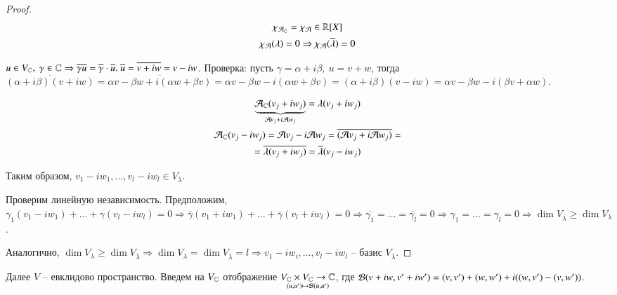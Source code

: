 \documentclass[main]{subfiles}
\begin{document}
\begin{proof}
    \begin{gather*}
        \chi_{\mathcal{A}_{\mathbb{C}}} = \chi_{\mathcal{A}} \in \mathbb{R}[X] \\
        \chi_{\mathcal{A}}(\lambda) = 0 \Rightarrow \chi_{\mathcal{A}}(\overline{\lambda}) = 0 \\
    \end{gather*}
    
    \begin{remark}
        $u \in V_{\C}, \ \gamma \in \C \Rightarrow \overline{\gamma u} = \overline{\gamma} \cdot \overline{u}. \ \overline{u} = \overline{v + iw} = v - iw$.
        Проверка: пусть $\gamma = \alpha + i\beta, \ u = v + w$, тогда $\overline{(\alpha + i\beta)(v + iw)} =
         \overline{\alpha v - \beta w + i(\alpha w + \beta v)} = \alpha v - \beta w - i(\alpha w + \beta v) = (\alpha + i\beta)(v - iw) =
        \alpha v - \beta w -i(\beta v + \alpha w)$.
    \end{remark}

    \begin{gather*}
        \underbrace{\mathcal{A}_{\mathbb{C}}(v_j + iw_j)}_{\mathcal{A} v_j + i\mathcal{A} w_j} = \lambda(v_j + iw_j) \\
        \mathcal{A}_{\mathbb{C}}(v_j - iw_j) = \mathcal{A} v_j - i\mathcal{A} w_j = \overline{(\mathcal{A} v_j + i\mathcal{A} w_j)} = \\
        = \overline{\lambda(v_j + iw_j)} = \overline{\lambda}(v_j-iw_j)
    \end{gather*}

    Таким образом, $v_1 - iw_1, \ldots, v_l - iw_l \in V_{\overline{\lambda}}$.

    Проверим линейную независимость. Предположим, $\gamma_1(v_1 - iw_1) + \ldots +
    \gamma(v_l - iw_l) = 0 \Rightarrow \overline{\gamma}(v_1 + iw_1) + \ldots + \overline{\gamma}(v_l + iw_l) = 0 \Rightarrow
    \overline{\gamma_1} = \ldots = \overline{\gamma_l} = 0 \Rightarrow \gamma_1 = \ldots = \gamma_l = 0 \Rightarrow
    \dim V_{\overline{\lambda}} \geq \dim V_{\lambda}$.

    Аналогично, $\dim V_{\lambda} \geq \dim V_{\overline{\lambda}} \Rightarrow
    \dim V_{\lambda} = \dim V_{\overline{\lambda}} = l \Rightarrow 
    v_1 - iw_i, \ldots, v_l - iw_l$ -- базис $V_{\overline{\lambda}}$.
\end{proof}

    Далее $V$ -- евклидово пространство. Введем на $V_{\mathbb{C}}$ отображение $\underset{(u, u') \mapsto \mathcal{B}(u, u')}{V_{\mathbb{C}}\times V_{\mathbb{C}}\to\mathbb{C}}$, 
    где $\mathcal{B}(v+iw, v'+iw') = (v, v') + (w, w') + i((w, v') - (v, w'))$. 
\end{document}
